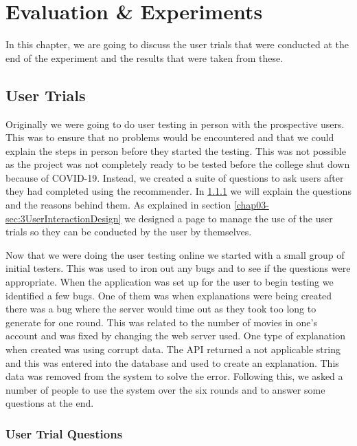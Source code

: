 \chapter{Evaluation \& Experiments}\label{sec:userTrials} %
    
    In this chapter, we are going to discuss the user trials that were conducted at the end of the experiment and the results that were taken from these.

    \section{User Trials}
        Originally we were going to do user testing in person with the prospective users. This was to ensure that no problems would be encountered and that we could explain the steps in person before they started the testing. This was not possible as the project was not completely ready to be tested before the college shut down because of COVID-19. Instead, we created a suite of questions to ask users after they had completed using the recommender. In \ref{sec:UserTrialQuestions} we will explain the questions and the reasons behind them. As explained in section \ref{chap03-sec:3UserInteractionDesign} we designed a page to manage the use of the user trials so they can be conducted by the user by themselves. 

        Now that we were doing the user testing online we started with a small group of initial testers. This was used to iron out any bugs and to see if the questions were appropriate. When the application was set up for the user to begin testing we identified a few bugs. One of them was when explanations were being created there was a bug where the server would time out as they took too long to generate for one round. This was related to the number of movies in one's account and was fixed by changing the web server used. One type of explanation when created was using corrupt data. The API returned a not applicable string and this was entered into the database and used to create an explanation. This data was removed from the system to solve the error. Following this, we asked a number of people to use the system over the six rounds and to answer some questions at the end.

    
        \subsection{User Trial Questions}\label{sec:UserTrialQuestions}
        
